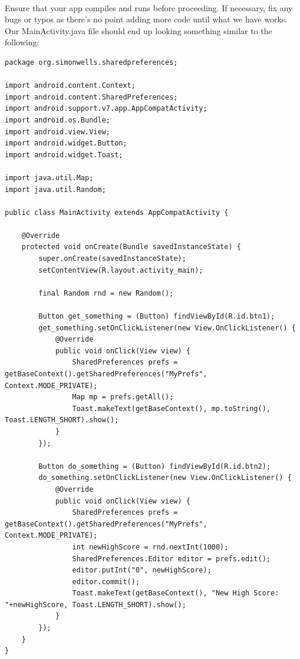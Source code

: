 \paragraph{} Ensure that your app compiles and runs before proceeding. If necessary, fix any bugs or typos as there's no point adding more code until what we have works. Our MainActivity.java file should end up looking something similar to the following:

\begin{lstlisting}
package org.simonwells.sharedpreferences;

import android.content.Context;
import android.content.SharedPreferences;
import android.support.v7.app.AppCompatActivity;
import android.os.Bundle;
import android.view.View;
import android.widget.Button;
import android.widget.Toast;

import java.util.Map;
import java.util.Random;

public class MainActivity extends AppCompatActivity {

    @Override
    protected void onCreate(Bundle savedInstanceState) {
        super.onCreate(savedInstanceState);
        setContentView(R.layout.activity_main);

        final Random rnd = new Random();

        Button get_something = (Button) findViewById(R.id.btn1);
        get_something.setOnClickListener(new View.OnClickListener() {
            @Override
            public void onClick(View view) {
                SharedPreferences prefs = getBaseContext().getSharedPreferences("MyPrefs", Context.MODE_PRIVATE);
                Map mp = prefs.getAll();
                Toast.makeText(getBaseContext(), mp.toString(), Toast.LENGTH_SHORT).show();
            }
        });

        Button do_something = (Button) findViewById(R.id.btn2);
        do_something.setOnClickListener(new View.OnClickListener() {
            @Override
            public void onClick(View view) {
                SharedPreferences prefs = getBaseContext().getSharedPreferences("MyPrefs", Context.MODE_PRIVATE);
                int newHighScore = rnd.nextInt(1000);
                SharedPreferences.Editor editor = prefs.edit();
                editor.putInt("0", newHighScore);
                editor.commit();
                Toast.makeText(getBaseContext(), "New High Score: "+newHighScore, Toast.LENGTH_SHORT).show();
            }
        });
    }
}
\end{lstlisting}

